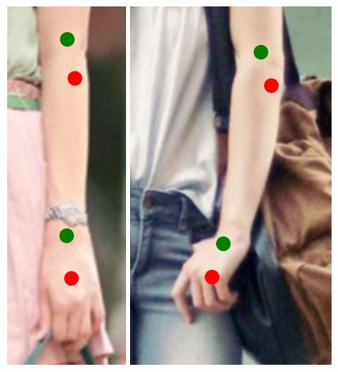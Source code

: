 \begin{figure}[!t]
    \includegraphics[height=\fh]{resources/Annotation_Correction/Fixing/fix_12}
    \hfill
    \includegraphics[height=\fh]{resources/Annotation_Correction/Fixing/fix_13}
    \hfill

\end{figure}
